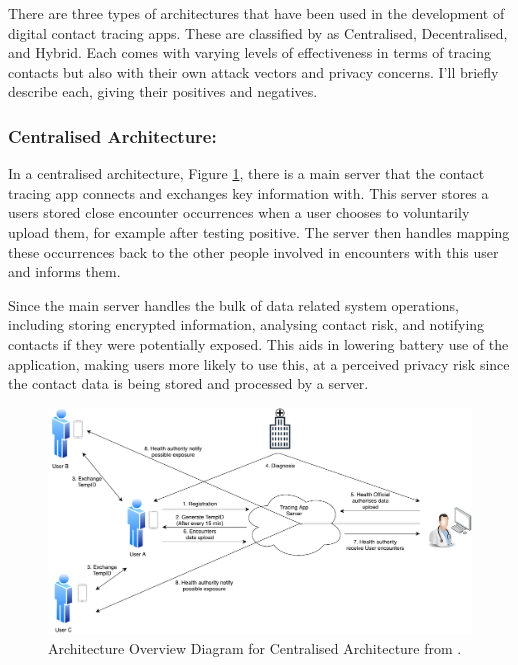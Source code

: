 \documentclass{l4proj}
\begin{document}
There are three types of architectures that have been used in the development of digital contact tracing apps. These are classified by \citet{ahmed_survey_2020} as Centralised, Decentralised, and Hybrid. Each comes with varying levels of effectiveness in terms of tracing contacts but also with their own attack vectors and privacy concerns. I'll briefly describe each, giving their positives and negatives.

\subsubsection{Centralised Architecture:}

In a centralised architecture, Figure \ref{fig:centralised_arch}, there is a main server that the contact tracing app connects and exchanges key information with. This server stores a users stored close encounter occurrences when a user chooses to voluntarily upload them, for example after testing positive. The server then handles mapping these occurrences back to the other people involved in encounters with this user and informs them.

Since the main server handles the bulk of data related system operations, including storing encrypted information, analysing contact risk, and notifying contacts if they were potentially exposed. This aids in lowering battery use of the application, making users more likely to use this, at a perceived privacy risk since the contact data is being stored and processed by a server.

\begin{figure}[!htb]
    \centering
    \includegraphics[width=0.8\linewidth]{images/ahmed_centralised.png}

    \caption{ Architecture Overview Diagram for Centralised Architecture from \citet{ahmed_survey_2020}.
    }

    \label{fig:centralised_arch}
\end{figure}
\end{document}
